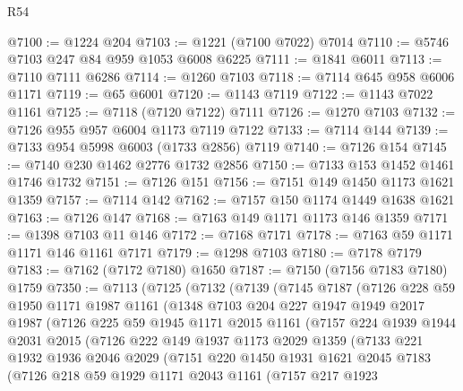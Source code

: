 \begin{lexlean}{R54}
\begin{coremodule}
@7100 := @1224 @204
@7103 := @1221 (@7100 @7022) @7014
@7110 := @5746 @7103 @247 @84 @959 @1053 @6008 @6225
@7111 := @1841 @6011
@7113 := @7110 @7111 @6286
@7114 := @1260 @7103
@7118 := @7114 @645 @958 @6006 @1171
@7119 := @65 @6001
@7120 := @1143 @7119
@7122 := @1143 @7022 @1161
@7125 := @7118 (@7120 @7122) @7111
@7126 := @1270 @7103
@7132 := @7126 @955 @957 @6004 @1173 @7119 @7122
@7133 := @7114 @144
@7139 := @7133 @954 @5998 @6003 (@1733 @2856) @7119
@7140 := @7126 @154
@7145 := @7140 @230 @1462 @2776 @1732 @2856
@7150 := @7133 @153 @1452 @1461 @1746 @1732
@7151 := @7126 @151
@7156 := @7151 @149 @1450 @1173 @1621 @1359
@7157 := @7114 @142
@7162 := @7157 @150 @1174 @1449 @1638 @1621
@7163 := @7126 @147
@7168 := @7163 @149 @1171 @1173 @146 @1359
@7171 := @1398 @7103 @11 @146
@7172 := @7168 @7171
@7178 := @7163 @59 @1171 @1171 @146 @1161 @7171
@7179 := @1298 @7103
@7180 := @7178 @7179
@7183 := @7162 (@7172 @7180) @1650
@7187 := @7150 (@7156 @7183 @7180) @1759
@7350 := @7113
    (@7125
      (@7132
        (@7139
          (@7145
            @7187
            (@7126
              @228
              @59
              @1950
              @1171
              @1987
              @1161
              (@1348
                @7103
                @204
                @227
                @1947
                @1949
                @2017
                @1987
                (@7126
                  @225
                  @59
                  @1945
                  @1171
                  @2015
                  @1161
                  (@7157
                    @224
                    @1939
                    @1944
                    @2031
                    @2015
                    (@7126
                      @222
                      @149
                      @1937
                      @1173
                      @2029
                      @1359
                      (@7133
                        @221
                        @1932
                        @1936
                        @2046
                        @2029
                        (@7151
                          @220
                          @1450
                          @1931
                          @1621
                          @2045
                          @7183
                          (@7126
                            @218
                            @59
                            @1929
                            @1171
                            @2043
                            @1161
                            (@7157
                              @217
                              @1923

\end{coremodule}
\end{lexlean}
